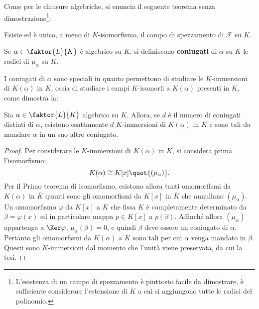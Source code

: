 \documentclass[12pt]{scrartcl}
\begin{document}
	Come per le chiusure algebriche, si enuncia il seguente
	teorema senza dimostrazione\footnote{
		L'esistenza di un campo di spezzamento è piuttosto
		facile da dimostrare, è sufficiente considerare
		l'estensione di $K$ a cui si aggiungono tutte le
		radici del polinomio.
	}:
	
	\begin{theorem}
		Esiste ed è unico, a meno di $K$-isomorfismo, il
		campo di spezzamento di $\mathcal{F}$ su $K$.
	\end{theorem}
	
	\begin{definition}
		Se $\alpha \in \faktor{L}{K}$ è algebrico su $K$, si definiscono \textbf{coniugati} di $\alpha$ su $K$ le
		radici di $\mu_\alpha$ su $K$.
	\end{definition}
	
	I coniugati di $\alpha$ sono speciali in quanto
	permettono di studiare
	le $K$-immersioni di $K(\alpha)$ in $\overline{K}$, ossia
	di studiare i campi $K$-isomorfi a $K(\alpha)$ presenti in
	$\overline{K}$, come dimostra la:
	
	\begin{proposition}
		Sia $\alpha \in \faktor{L}{K}$ algebrico su $K$. Allora,
		se $d$ è il numero di coniugati distinti di $\alpha$,
		esistono esattamente $d$ $K$-immersioni di $K(\alpha)$
		in $\overline{K}$ e sono tali da mandare $\alpha$ in
		un suo altro coniugato.
	\end{proposition}
	
	\begin{proof}
		Per considerare le $K$-immersioni di $K(\alpha)$ in
		$K$, si considera prima l'isomorfismo:
		\[ K(\alpha) \cong K[x] \quot{(\mu_\alpha)}. \]
		Per il Primo teorema di isomorfismo, esistono
		allora tanti omomorfismi da $K(\alpha)$ in $\overline{K}$
		quanti sono gli omomorfismi da $K[x]$ in $\overline{K}$ che
		annullano $(\mu_\alpha)$. Un omomorfismo $\varphi$
		da $K[x]$ a $\overline{K}$ che fissa $K$ è completamente determinato da
		$\beta = \varphi(x)$ ed in particolare mappa $p \in K[x]$
		a $p(\beta)$. Affinché allora $(\mu_\alpha)$
		appartenga a $\Ker \varphi$, $\mu_\alpha(\beta) = 0$, e quindi
		$\beta$ deve essere un coniugato di $\alpha$. Pertanto
		gli omomorfismi da $K(\alpha)$ a $\overline{K}$ sono
		tali per cui $\alpha$ venga mandato in $\beta$. Questi
		sono $K$-immersioni dal momento che l'unità viene preservata,
		da cui la tesi.
	\end{proof}
	
\end{document}
